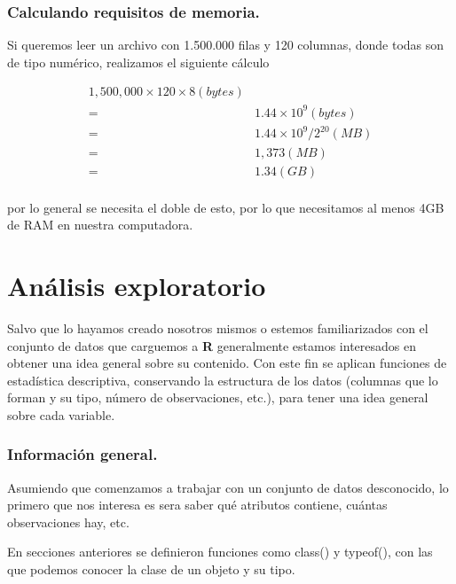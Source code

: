 \documentclass[
  12pt,
]{book}
\begin{document}
\hypertarget{calculando-requisitos-de-memoria.}{%
\subsection{\texorpdfstring{\textbf{Calculando requisitos de memoria}.}{Calculando requisitos de memoria.}}\label{calculando-requisitos-de-memoria.}}

Si queremos leer un archivo con 1.500.000 filas y 120 columnas, donde todas son de tipo numérico, realizamos el siguiente cálculo

\begin{align*}
1,500,000\times120\times 8 (bytes)\\
=&1.44\times10^9 (bytes)\\
=&1.44\times10^9 / 2^{20} (MB)\\
=&1,373 (MB)\\
=&1.34 (GB)\\
\end{align*}

por lo general se necesita el doble de esto, por lo que necesitamos al menos 4GB de RAM en nuestra computadora.

\hypertarget{anuxe1lisis-exploratorio}{%
\chapter{\texorpdfstring{\textbf{Análisis exploratorio}}{Análisis exploratorio}}\label{anuxe1lisis-exploratorio}}

Salvo que lo hayamos creado nosotros mismos o estemos familiarizados con el conjunto de datos que carguemos a \textbf{R}
generalmente estamos interesados en obtener una idea general sobre su contenido.
Con este fin se aplican funciones de estadística descriptiva, conservando la estructura de los datos (columnas
que lo forman y su tipo, número de observaciones, etc.), para tener una idea general
sobre cada variable.

\hypertarget{informaciuxf3n-general.}{%
\subsection{\texorpdfstring{\textbf{Información general}.}{Información general.}}\label{informaciuxf3n-general.}}

Asumiendo que comenzamos a trabajar con un conjunto de datos desconocido, lo primero que
nos interesa es sera saber qué atributos contiene, cuántas observaciones hay, etc.

En secciones anteriores se definieron funciones como class() y typeof(), con las
que podemos conocer la clase de un objeto y su tipo.
\end{document}
